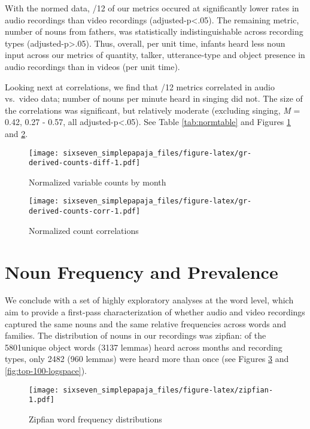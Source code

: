 \documentclass[floatsintext,man]{apa6}
\theoremstyle{definition}
\theoremstyle{definition}
\theoremstyle{definition}
\theoremstyle{remark}
\begin{document}
With the normed data, /12 of our metrics occured at significantly lower
rates in audio recordings than video recordings
(adjusted-p\textless{}.05). The remaining metric, number of nouns from
fathers, was statistically indistinguishable across recording types
(adjusted-p\textgreater{}.05). Thus, overall, per unit time, infants
heard less noun input across our metrics of quantity, talker,
utterance-type and object presence in audio recordings than in videos
(per unit time).

Looking next at correlations, we find that /12 metrics correlated in
audio vs.~video data; number of nouns per minute heard in singing did
not. The size of the correlations was significant, but relatively
moderate (excluding singing, \emph{M} = 0.42, 0.27 - 0.57, all
adjusted-p\textless{}.05). See Table \ref{tab:normtable} and Figures
\ref{fig:gr-derived-counts-diff} and \ref{fig:gr-derived-counts-corr}.

\begin{figure}
\centering
\texttt{[image: sixseven\_simplepapaja\_files/figure-latex/gr-derived-counts-diff-1.pdf]}
\caption{\label{fig:gr-derived-counts-diff}Normalized variable counts by
month}
\end{figure}

\begin{figure}
\centering
\texttt{[image: sixseven\_simplepapaja\_files/figure-latex/gr-derived-counts-corr-1.pdf]}
\caption{\label{fig:gr-derived-counts-corr}Normalized count correlations}
\end{figure}

\section{Noun Frequency and
Prevalence}\label{noun-frequency-and-prevalence}

We conclude with a set of highly exploratory analyses at the word level,
which aim to provide a first-pass characterization of whether audio and
video recordings captured the same nouns and the same relative
frequencies across words and families. The distribution of nouns in our
recordings was zipfian: of the 5801unique object words (3137 lemmas)
heard across months and recording types, only 2482 (960 lemmas) were
heard more than once (see Figures \ref{fig:zipfian} and
\ref{fig:top-100-logspace}).

\begin{figure}
\centering
\texttt{[image: sixseven\_simplepapaja\_files/figure-latex/zipfian-1.pdf]}
\caption{\label{fig:zipfian}Zipfian word frequency distributions}
\end{figure}
\end{document}
